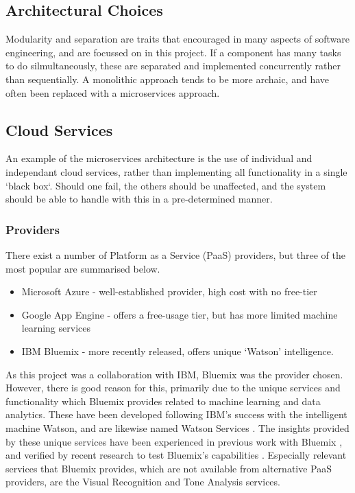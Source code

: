 \documentclass{article}
\begin{document}
\subsection{Architectural Choices}
Modularity and separation are traits that encouraged in many aspects of software engineering, and are focussed on in this project. If a component has many tasks to do silmultaneously, these are separated and implemented concurrently rather than sequentially. A monolithic approach tends to be more archaic, and have often been replaced with a microservices approach. 

\subsection{Cloud Services}
An example of the microservices architecture is the use of individual and independant cloud services, rather than implementing all functionality in a single `black box`. Should one fail, the others should be unaffected, and the system should be able to handle with this in a pre-determined manner. 
\subsubsection{Providers}
There exist a number of Platform as a Service (PaaS) providers, but three of the most popular are summarised below.
\begin{itemize}
    \item Microsoft Azure - well-established provider, high cost with no free-tier
    \item Google App Engine - offers a free-usage tier, but has more limited machine learning services
    \item IBM Bluemix - more recently released, offers unique `Watson' intelligence.
\end{itemize}
As this project was a collaboration with IBM, Bluemix was the provider chosen. However, there is good reason for this, primarily due to the unique services and functionality which Bluemix provides related to machine learning and data analytics. These have been developed following IBM's success with the intelligent machine Watson, and are likewise named Watson Services \cite{Watson}. The insights provided by these unique services have been experienced in previous work with Bluemix \cite{EdgeOfSpace}, and verified by recent research to test Bluemix's capabilities \cite{Sentiment}. Especially relevant services that Bluemix provides, which are not available from alternative PaaS providers, are the Visual Recognition and Tone Analysis services.
\end{document}
